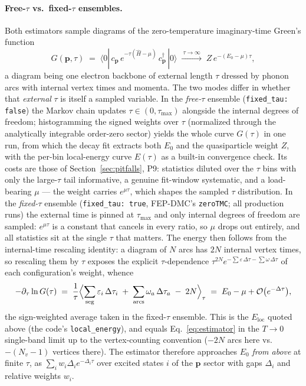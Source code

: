 \documentclass[11pt]{article}
\begin{document}
\paragraph{Free-$\tau$ vs.\ fixed-$\tau$ ensembles.}
Both estimators sample diagrams of the zero-temperature imaginary-time Green's function
\begin{equation}
  G(\mathbf{p},\tau) \;=\;
  \langle 0|\,c_{\mathbf{p}}\,e^{-\tau(\hat H-\mu)}\,c_{\mathbf{p}}^{\dagger}\,|0\rangle
  \;\xrightarrow{\ \tau\to\infty\ }\; Z\,e^{-(E_{0}-\mu)\tau},
  \label{eq:green}
\end{equation}
a diagram being one electron backbone of external length $\tau$ dressed by phonon arcs
with internal vertex times and momenta. The two modes differ in whether that
\emph{external} $\tau$ is itself a sampled variable. In the \emph{free-$\tau$} ensemble
(\texttt{fixed\_tau: false}) the Markov chain updates $\tau\in(0,\tau_{\max})$ alongside
the internal degrees of freedom; histogramming the signed weights over $\tau$
(normalized through the analytically integrable order-zero sector) yields the whole
curve $G(\tau)$ in one run, from which the decay fit extracts both $E_{0}$ and the
quasiparticle weight $Z$, with the per-bin local-energy curve $E(\tau)$ as a built-in
convergence check. Its costs are those of Section~\ref{sec:pitfalls}, P9: statistics
diluted over the $\tau$ bins with only the large-$\tau$ tail informative, a genuine
fit-window systematic, and a load-bearing $\mu$ --- the weight carries $e^{\mu\tau}$,
which shapes the sampled $\tau$ distribution. In the \emph{fixed-$\tau$} ensemble
(\texttt{fixed\_tau: true}, FEP-DMC's \texttt{zeroTMC}; all production runs) the
external time is pinned at $\tau_{\max}$ and only internal degrees of freedom are
sampled: $e^{\mu\tau}$ is a constant that cancels in every ratio, so $\mu$ drops out
entirely, and all statistics sit at the single $\tau$ that matters. The energy then
follows from the internal-time rescaling identity: a diagram of $N$ arcs has $2N$
internal vertex times, so rescaling them by $\tau$ exposes the explicit
$\tau$-dependence $\tau^{2N}e^{-\sum\varepsilon\,\Delta\tau-\sum\omega\,\Delta\tau}$ of
each configuration's weight, whence
\begin{equation}
  -\partial_{\tau}\ln G(\tau)
  \;=\; \frac{1}{\tau}\Bigl\langle
    \sum_{\mathrm{seg}}\varepsilon_{i}\,\Delta\tau_{i}
    \;+\;\sum_{\mathrm{arcs}}\omega_{a}\,\Delta\tau_{a}
    \;-\;2N
  \Bigr\rangle_{\tau}
  \;=\; E_{0}-\mu+\mathcal{O}\bigl(e^{-\Delta\tau}\bigr),
  \label{eq:logderiv}
\end{equation}
the sign-weighted average taken in the fixed-$\tau$ ensemble. This is the
$E_{\mathrm{loc}}$ quoted above (the code's \texttt{local\_energy}), and equals
Eq.~\eqref{eq:estimator} in the $T\to0$ single-band limit up to the vertex-counting
convention ($-2N$ arcs here vs.\ $-(N_{v}-1)$ vertices there). The estimator therefore
approaches $E_{0}$ \emph{from above} at finite $\tau$, as $\sum_{i}w_{i}\Delta_{i}e^{-\Delta_{i}\tau}$ over excited states $i$ of the $\mathbf{p}$ sector with gaps $\Delta_{i}$ and relative weights $w_{i}$.
\end{document}
